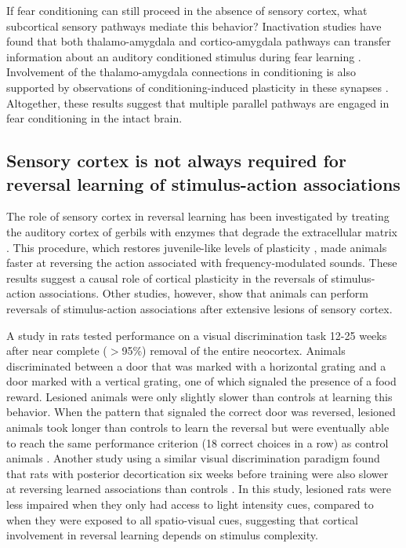 If fear conditioning can still proceed in the absence of sensory cortex, what subcortical sensory pathways mediate this behavior? Inactivation studies have found that both thalamo-amygdala and cortico-amygdala pathways can transfer information about an auditory conditioned stimulus during fear learning \citep{Romanski1992, Campeau1995}. Involvement of the thalamo-amygdala connections in conditioning is also supported by observations of conditioning-induced plasticity in these synapses \citep{McKernan1997, Quirk1997, Maren2004}. Altogether, these results suggest that multiple parallel pathways are engaged in fear conditioning in the intact brain.


\subsection{Sensory cortex is not always required for reversal learning of stimulus-action associations}

The role of sensory cortex in reversal learning has been investigated by treating the auditory cortex of gerbils with enzymes that degrade the extracellular matrix \citep{Happel2014}. This procedure, which restores juvenile-like levels of plasticity \citep{Pizzorusso2002, Gogolla2009}, made animals faster at reversing the action associated with frequency-modulated sounds. These results suggest a causal role of cortical plasticity in the reversals of stimulus-action associations. 
%
Other studies, however, show that animals can perform reversals of stimulus-action associations after extensive lesions of sensory cortex.

A study in rats tested performance on a visual discrimination task 12-25 weeks after near complete ($>$95\%) removal of the entire neocortex.
%
Animals discriminated between a door that was marked with a horizontal grating and a door marked with a vertical grating, one of which signaled the presence of a food reward. Lesioned animals were only slightly slower than controls at learning this behavior. When the pattern that signaled the correct door was reversed, lesioned animals took longer than controls to learn the reversal but were eventually able to reach the same performance criterion (18 correct choices in a row) as control animals \citep{Oakley1981}.
%
Another study using a similar visual discrimination paradigm found that rats with posterior decortication six weeks before training were also slower at reversing learned associations than controls \citep{Birch1978}. In this study, lesioned rats were less impaired when they only had access to light intensity cues, compared to when they were exposed to all spatio-visual cues, suggesting that cortical involvement in reversal learning depends on stimulus complexity. 



